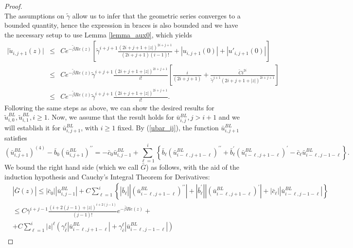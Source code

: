 \documentclass[10pt,a4paper]{amsart}
\begin{document}
\begin{proof}
$$$$
%
The assumptions on $\tilde{\gamma}$ allow us to infer that the geometric series converges to a bounded quantity, hence the expression in braces is also bounded and we have the necessary setup to use Lemma \ref{lemma_aux0}, which yields
%
\begin{eqnarray*}
\vert \tilde{u}_{i,j+1}(z) \vert &\leq& C e^{-\tilde{\beta} Re(z)} \left[ \tilde{\gamma}^{i+j+1} \frac{(2i+j+1+|z|)^{2i+j+1}}{(2i+j+1) (i-1)!}
+|{u}_{i,j+1}(0)|+|{u}'_{i,j+1}(0)| \right] \\
&\leq& C e^{-\tilde{\beta} Re(z)} \tilde{\gamma}^{i+j+1} \frac{(2i+j+1+|z|)^{2i+j+1}}{i!} \left[ \frac{i}{(2i+j+1)}+\frac{\tilde{C} i^{2i}}{\tilde{\gamma}^{j+1} (2i+j+1+|z|)^{2i+j+1}} \right] \\
&\leq& C e^{-\tilde{\beta} Re(z)} \tilde{\gamma}^{i+j+1} \frac{(2i+j+1+|z|)^{2i+j+1}}{i!}.
\end{eqnarray*}
%
Following the same steps as above, we can show the desired results for $\tilde{u}^{BL}_{i,0},\tilde{u}^{BL}_{i,1}, i\geq 1$. Now, we assume that the result holds for $\bar{u}^{BL}_{i,j}, j > i+1$ and we will establish it for $\bar{u}^{BL}_{i,j+1}$, with $i\geq 1$ fixed. By (\ref{ubar_ij}), the function $\bar{u}^{BL}_{i,j+1}$ satisfies
%
$$
\left(\bar{u}_{i, j+1}^{B L}\right)^{(4)}-\bar{b}_0\left(\bar{u}_{i, j+1}^{B L}\right)^{\prime \prime}=-\bar{c}_0 \bar{u}_{i, j-1}^{B L}+\sum_{\ell=1}^i\left\{\bar{b}_{\ell}\left(\bar{u}_{i-\ell, j+1-\ell}^{B L}\right)^{\prime \prime}+\bar{b}_{\ell}^{\prime}\left(\bar{u}_{i-\ell, j+1-\ell}^{B L}\right)^{\prime}-\bar{c}_{\ell} \bar{u}_{i-\ell, j-1-\ell}^{B L}\right\} .
$$
%
We bound the right hand side (which we call $\bar{G}$)  as follows, with the aid of the induction hypothesis and Cauchy's Integral Theorem for Derivatives:
$$
\begin{aligned}
& |\bar{G}(z)| \leq\left|\bar{c}_0\right|\left|\bar{u}_{i, j-1}^{B L}\right|+C \sum_{\ell=1}^i\left\{\left|\bar{b}_{\ell}\right|\left|\left(\bar{u}_{i-\ell, j+1-\ell}^{B L}\right)^{\prime \prime}\right|+\left|\bar{b}_{\ell}^{\prime}\right|\left|\left(\bar{u}_{i-\ell, j+1-\ell}^{B L}\right)^{\prime}\right|+\left|\bar{c}_{\ell}\right|\left|\bar{u}_{i-\ell, j-1-\ell}^{B L}\right|\right\} \\
& \leq C \bar{\gamma}^{i+j-1} \frac{(i+2(j-1)+|z|)^{i+2(j-1)}}{(j-1)!} e^{-\bar{\beta} R e(z)}+ \\
& +C \sum_{\ell=1}^i|z|^{\ell}\left(\gamma_{\bar{\ell}}^{\ell}\left|\bar{u}_{i-\ell, j+1-\ell}^{B L}\right|+\gamma_{\bar{c}}^{\ell}\left|\bar{u}_{i-\ell, j-1-\ell}^{B L}\right|\right) \\

\end{aligned}$$
\end{proof}
\end{document}
